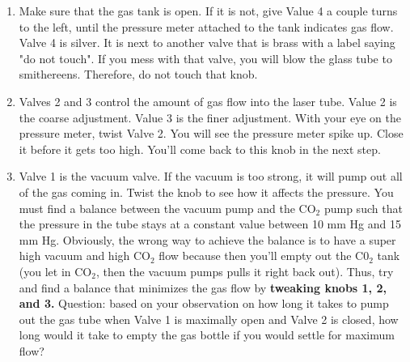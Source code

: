 \documentclass{../lab}
\begin{document}
\begin{enumerate}
    \item Make sure that the gas tank is open. If it is not, give Value 4 a couple turns to the left, until the pressure meter attached to the tank indicates gas flow. Valve 4 is silver. It is next to another valve that is brass with a label saying "do not touch". If you mess with that valve, you will blow the glass tube to smithereens. Therefore, do not touch that knob.
    
    \item Valves 2 and 3 control the amount of gas flow into the laser tube. Value 2 is the coarse adjustment. Value 3 is the finer adjustment. With your eye on the pressure meter, twist Valve 2. You will see the pressure meter spike up. Close it before it gets too high. You'll come back to this knob in the next step.
    
    \item Valve 1 is the vacuum valve. If the vacuum is too strong, it will pump out all of the gas coming in. Twist the knob to see how it affects the pressure. You must find a balance between the vacuum pump and the CO$_2$ pump such that the pressure in the tube stays at a constant value between 10 mm Hg and 15 mm Hg. Obviously, the wrong way to achieve the balance is to have a super high vacuum and high CO$_2$ flow because then you'll empty out the C0$_2$ tank (you let in CO$_2$, then the vacuum pumps pulls it right back out).  Thus, try and find a balance that minimizes the gas flow by \textbf{tweaking knobs 1, 2, and 3.} 
    Question: based on your observation on how long it takes to pump out the gas tube when Valve 1 is maximally open and Valve 2 is closed, how long would it take to empty the gas bottle if you would settle for maximum flow?






\end{enumerate}
\end{document}
